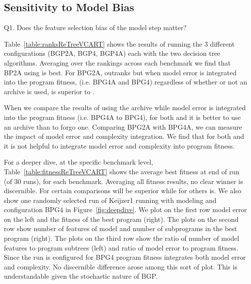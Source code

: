 \subsection{Sensitivity to Model Bias}\label{sect:ftr-select}

Q1. Does the feature selection bias of the model step matter? 



Table~\ref{table:ranksReTreeVCART} shows the results of running the 3 different configurations (BGP2A, BGP4, BGP4A) each with the two decision tree algorithms.  Averaging over the rankings across each benchmark we find that BP2A using \REPTREE is best. For BPG2A, \REPTREE outranks \SCIKIT but when model error is integrated into the program fitness, (i.e. BPG4A and BPG4) regardless of whether or not an archive is used, \SCIKIT is superior to \REPTREE.  

When we compare the results of using the archive while model error is integrated into the program fitness (i.e.  BPG4A to BPG4), for both \REPTREE and \SCIKIT it is better to use an archive than to forgo one.  Comparing BPG2A with BPG4A, we can measure the impact of model error and complexity integration.  We find that for both \SCIKIT and \REPTREE it is not helpful to integrate model error and complexity into program fitness. 

For a deeper dive, at the specific benchmark level, Table~\ref{table:fitnessReTreeVCART} shows the average best fitness at end of run (of 30 runs), for each benchmark.   Averaging all fitness results, no clear winner is  discernible. For certain comparisons \SCIKIT will be superior while for others \REPTREE is.   We also show one randomly selected run of Keijzer1 running with \REPTREE modeling and configuration BPG4 in Figure~\ref{fig:deepdive}.   We plot on the first row  model error on the left and the fitness of the best program (right).  The plots on the second row show number of features of model  and number of subprograms in the best program (right). The plots on the third row show the ratio of number of model features to program subtrees (left) and ratio of model error to program fitness. Since the run is configured for  BPG4 program fitness integrates both model error and complexity.  No discernible difference arose among this sort of plot. This is understandable given the stochastic nature of BGP.



